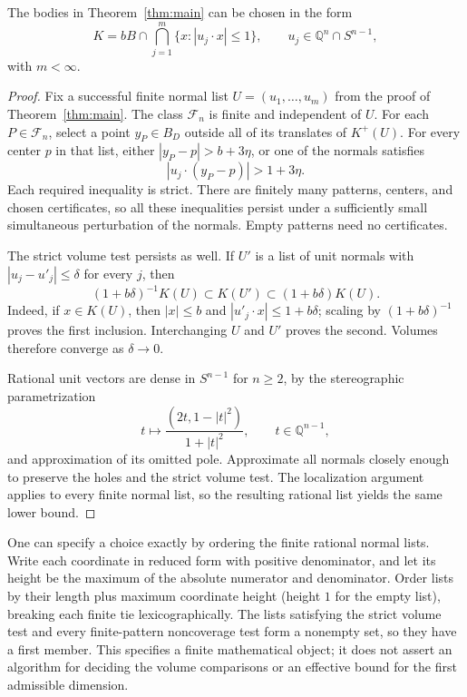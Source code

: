 \begin{proposition}\label{prop:rational}
The bodies in Theorem~\ref{thm:main} can be chosen in the form
\[
 K=bB\cap\bigcap_{j=1}^m\{x:|u_j\cdot x|\le1\},
 \qquad u_j\in\mathbb Q^n\cap S^{n-1},
\]
with $m<\infty$.
\end{proposition}
\begin{proof}
Fix a successful finite normal list $U=(u_1,\ldots,u_m)$ from the proof of
Theorem~\ref{thm:main}. The class $\mathcal F_n$ is finite and independent
of $U$. For each $P\in\mathcal F_n$, select a point $y_P\in B_D$ outside
all of its translates of $K^+(U)$. For every center $p$ in that list,
either $|y_P-p|>b+3\eta$, or one of the normals satisfies
\[
 |u_j\cdot(y_P-p)|>1+3\eta.
\]
Each required inequality is strict. There are finitely many patterns,
centers, and chosen certificates, so all these inequalities persist under
a sufficiently small simultaneous perturbation of the normals. Empty
patterns need no certificates.

The strict volume test persists as well. If $U'$ is a list of unit normals
with $|u_j-u'_j|\le\delta$ for every $j$, then
\begin{equation}\label{eq:volume-continuity}
 (1+b\delta)^{-1}K(U)\subset K(U')\subset(1+b\delta)K(U).
\end{equation}
Indeed, if $x\in K(U)$, then $|x|\le b$ and
$|u'_j\cdot x|\le1+b\delta$; scaling by $(1+b\delta)^{-1}$ proves the
first inclusion. Interchanging $U$ and $U'$ proves the second. Volumes
therefore converge as $\delta\to0$.

Rational unit vectors are dense in $S^{n-1}$ for $n\ge2$, by the
stereographic parametrization
\[
 t\longmapsto\frac{(2t,1-|t|^2)}{1+|t|^2},
 \qquad t\in\mathbb Q^{n-1},
\]
and approximation of its omitted pole. Approximate all normals closely
enough to preserve the holes and the strict volume test. The localization
argument applies to every finite normal list, so the resulting rational
list yields the same lower bound.

\end{proof}

One can specify a choice exactly by ordering the finite rational normal
lists. Write each coordinate in reduced form with positive denominator,
and let its height be the maximum of the absolute numerator and denominator.
Order lists by their length plus maximum coordinate height (height $1$
for the empty list), breaking each finite tie lexicographically.
The lists satisfying the strict volume test and every finite-pattern
noncoverage test form a nonempty set, so they have a first member.
This specifies a finite mathematical object; it does not assert an
algorithm for deciding the volume comparisons or an effective bound for
the first admissible dimension.
